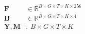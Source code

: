 \documentclass[border=3pt]{standalone}
\begin{document}
\color{ink}\fontsize{24}{32}\selectfont
$\displaystyle \begin{aligned}\mathbf F&\in\mathbb R^{B\times G\times T\times K\times256}\\\mathbf B&\in\mathbb R^{B\times G\times T\times K\times4}\\\mathbf Y,\mathbf M&:\ B\times G\times T\times K\end{aligned}$
\end{document}
